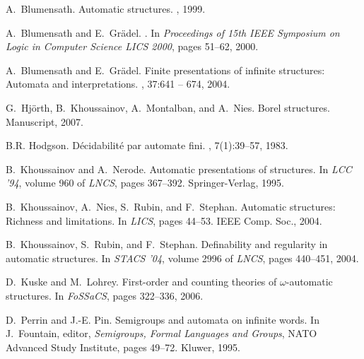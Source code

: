 \documentclass{stacs_proc}
\begin{document}
\vskip-0.3cm
\begin{thebibliography}{10}

A.~Blumensath.
\newblock Automatic structures.
, 1999.

A.~Blumensath and E.~Gr{\"a}del.
.
\newblock In {\em Proceedings of 15th IEEE Symposium on Logic in Computer
  Science LICS 2000}, pages 51--62, 2000.

A.~Blumensath and E.~Gr{\"a}del.
\newblock Finite presentations of infinite structures: Automata and
  interpretations.
, 37:641 -- 674, 2004.

G.~Hj{\"o}rth, B.~Khoussainov, A.~Montalban, and A.~Nies.
\newblock Borel structures.
\newblock Manuscript, 2007.

B.R. Hodgson.
\newblock D\'ecidabilit\'e par automate fini.
, 7(1):39--57, 1983.

B.~Khoussainov and A.~Nerode.
\newblock Automatic presentations of structures.
\newblock In {\em LCC '94}, volume 960 of {\em LNCS}, pages 367--392.
  Springer-Verlag, 1995.

B.~Khoussainov, A.~Nies, S.~Rubin, and F.~Stephan.
\newblock Automatic structures: Richness and limitations.
\newblock In {\em LICS}, pages 44--53. IEEE Comp. Soc., 2004.

B.~Khoussainov, S.~Rubin, and F.~Stephan.
\newblock Definability and regularity in automatic structures.
\newblock In {\em STACS '04}, volume 2996 of {\em LNCS}, pages 440--451, 2004.

D.~Kuske and M.~Lohrey.
\newblock First-order and counting theories of $\omega$-automatic structures.
\newblock In {\em FoSSaCS}, pages 322--336, 2006.

D.~Perrin and J.-E. Pin.
\newblock Semigroups and automata on infinite words.
\newblock In J.~Fountain, editor, {\em Semigroups, Formal Languages and
  Groups}, NATO Advanced Study Institute, pages 49--72. Kluwer, 1995.

\end{thebibliography}
\end{document}
